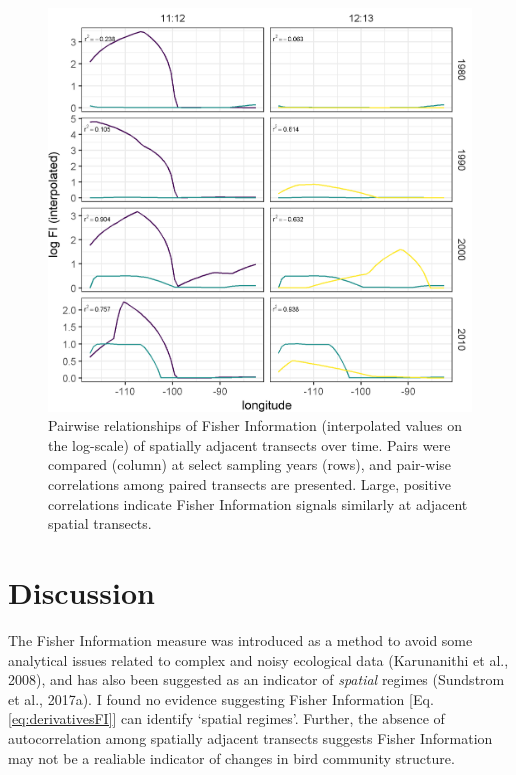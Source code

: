 \documentclass[12pt,twoside,openany]{reedthesis}
\begin{document}
\begin{figure}
\includegraphics[width=0.95\linewidth]{./chapterFiles/fisherSpatial/figures/figsCalledInDiss/interpolated_FI_corplotSelectTransects_East-West_log} \caption{Pairwise relationships of Fisher Information (interpolated values on the log-scale) of spatially adjacent transects over time. Pairs were compared (column) at select sampling years (rows), and pair-wise correlations among paired transects are presented. Large, positive correlations indicate Fisher Information signals similarly at adjacent spatial transects.}\label{fig:corPlotTsectsInterpLog}
\end{figure}
\section{Discussion}\label{discussion-1}

The Fisher Information measure was introduced as a method to avoid some
analytical issues related to complex and noisy ecological data
(Karunanithi et al., 2008), and has also been suggested as an indicator
of \emph{spatial} regimes (Sundstrom et al., 2017a). I found no evidence
suggesting Fisher Information {[}Eq. \eqref{eq:derivativesFI}{]} can
identify `spatial regimes'. Further, the absence of autocorrelation
among spatially adjacent transects suggests Fisher Information may not
be a realiable indicator of changes in bird community structure.
\end{document}
